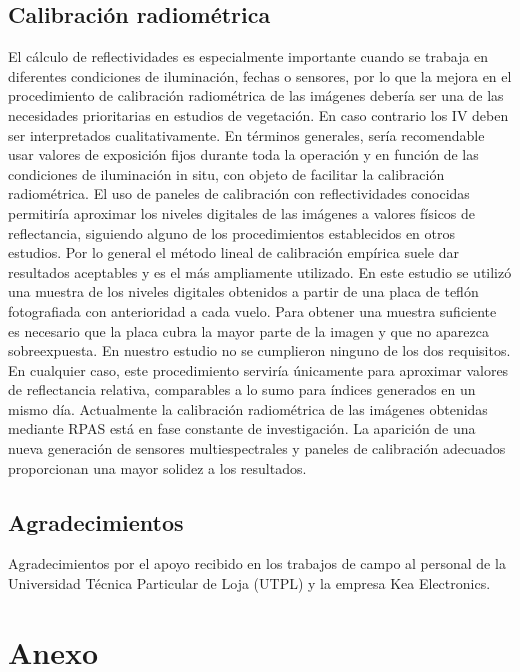 \documentclass[spanish,openany]{article}
\begin{document}
\subsection{Calibración radiométrica}\label{calibracion-radiometrica}

El cálculo de reflectividades es especialmente importante cuando se
trabaja en diferentes condiciones de iluminación, fechas o sensores, por
lo que la mejora en el procedimiento de calibración radiométrica de las
imágenes debería ser una de las necesidades prioritarias en estudios de
vegetación. En caso contrario los IV deben ser interpretados
cualitativamente. En términos generales, sería recomendable usar valores
de exposición fijos durante toda la operación y en función de las
condiciones de iluminación in situ, con objeto de facilitar la
calibración radiométrica. El uso de paneles de calibración con
reflectividades conocidas permitiría aproximar los niveles digitales de
las imágenes a valores físicos de reflectancia, siguiendo alguno de los
procedimientos establecidos en otros estudios. Por lo general el método
lineal de calibración empírica \citep{Smith1999} suele dar resultados
aceptables y es el más ampliamente utilizado. En este estudio se utilizó
una muestra de los niveles digitales obtenidos a partir de una placa de
teflón fotografiada con anterioridad a cada vuelo. Para obtener una
muestra suficiente es necesario que la placa cubra la mayor parte de la
imagen y que no aparezca sobreexpuesta. En nuestro estudio no se
cumplieron ninguno de los dos requisitos. En cualquier caso, este
procedimiento serviría únicamente para aproximar valores de reflectancia
relativa, comparables a lo sumo para índices generados en un mismo día.
Actualmente la calibración radiométrica de las imágenes obtenidas
mediante RPAS está en fase constante de investigación. La aparición de
una nueva generación de sensores multiespectrales y paneles de
calibración adecuados proporcionan una mayor solidez a los resultados.

\subsection*{Agradecimientos}\label{agradecimientos}

Agradecimientos por el apoyo recibido en los trabajos de campo al
personal de la Universidad Técnica Particular de Loja (UTPL) y la
empresa Kea Electronics.

\hypertarget{appendix}{\section{Anexo}\label{appendix}}
\end{document}
